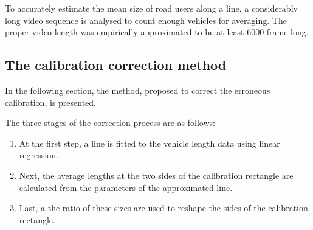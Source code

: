 To accurately estimate the mean size of road users along a line, a considerably long video sequence is analysed to count enough vehicles for averaging.
The proper video length was empirically approximated to be at least 6000-frame long.

\subsection{The calibration correction method}
In the following section, the method, proposed to correct the erroneous calibration, is presented.

The three stages of the correction process are as follows:
\begin{enumerate}
\item At the first step, a line is fitted to the vehicle length data using linear regression.
\item Next, the average lengths at the two sides of the calibration rectangle are calculated from the parameters of the approximated line.
\item Last, a the ratio of these sizes are used to reshape the sides of the calibration rectangle.
\end{enumerate}

